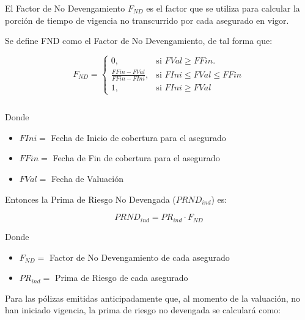 \documentclass[11pt,twoside,openright,spanish]{report}
\numberwithin{equation}{chapter}
\numberwithin{figure}{chapter}
\numberwithin{table}{chapter}
\begin{document}
	El Factor de No Devengamiento $F_{ND}$ es el factor que se utiliza para calcular la porción de tiempo de vigencia no transcurrido por cada asegurado en vigor.
	
	Se define FND como el Factor de No Devengamiento, de tal forma que:
		
	\begin{equation}	
		F_{ND}=\begin{cases}
		0, & \text{si } FVal \geqslant FFin.\\
		\frac{FFin-FVal}{FFin-FIni}, & \text{si } FIni \leqslant FVal \leqslant FFin\\
		1, & \text{si } FIni \geqslant FVal
		\end{cases}
	\label{eq14}
		\end{equation}

 
	$ $
	
	Donde
	
	 
		\begin{itemize}
		\setlength\itemsep{-0.5em}
	\item $FIni=$ Fecha de Inicio de cobertura para el asegurado
	
	\item $FFin=$ Fecha de Fin de cobertura para el asegurado
	
	\item $FVal=$ Fecha de Valuación

\end{itemize}
 
	
	Entonces la Prima de Riesgo No Devengada ($PRND_{ind}$) es:
	

	
\begin{equation}
		{PRND}_{ind}^{}={{PR}_{ind}\cdot F_{ND}}
		\label{eq15}
\end{equation}

 
	
	Donde
	
	\begin{itemize}
	\setlength\itemsep{-0.5em}	 
	
	\item $F_{ND}=$ Factor de No Devengamiento de cada asegurado
	
	\item $PR_{ind}=$ Prima de Riesgo de cada asegurado 
	\end{itemize}
	 

 
	
	Para las pólizas emitidas anticipadamente que, al momento de la valuación, no han iniciado vigencia, la prima de riesgo no devengada se calculará como:
	
\end{document}
